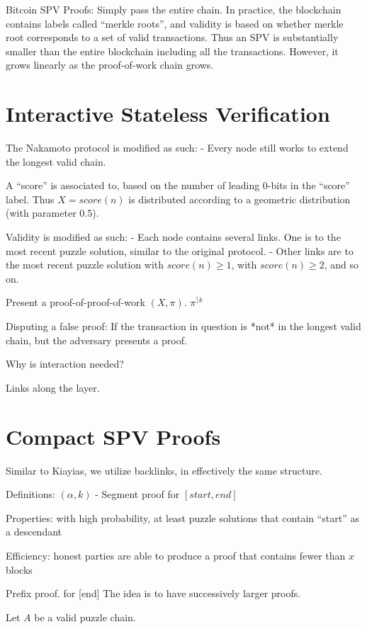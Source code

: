 \documentclass[11pt]{llncs}
\begin{document}
Bitcoin SPV Proofs:
	Simply pass the entire chain.
	In practice, the blockchain contains labels called “merkle roots”, and validity is based on whether merkle root corresponds to a set of valid transactions. Thus an SPV is substantially smaller than the entire blockchain including all the transactions. However, it grows linearly as the proof-of-work chain grows.

\section{Interactive Stateless Verification}

The Nakamoto protocol is modified as such:
- Every node still works to extend the longest valid chain.

A ``score'' is associated to, based on the number of leading 0-bits in the
``score'' label. Thus $X = score(n)$ is distributed according to a geometric distribution (with parameter 0.5).

Validity is modified as such:
- Each node contains several links. One is to the most recent puzzle solution, similar to the original protocol.
- Other links are to the most recent puzzle solution with $score(n) \geq
1$,  with $score(n) \geq 2$, and so on.

Present a proof-of-proof-of-work $(X, \pi)$. $\pi^{\rceil k}$

Disputing a false proof:
    If the transaction in question is *not* in the longest valid chain, but the adversary presents a proof.

Why is interaction needed?

Links along the layer.

\section{Compact SPV Proofs}

Similar to Kiayias, we utilize backlinks, in effectively the same structure.

Definitions:
$(\alpha, k)$ - Segment proof for $[start, end]$

Properties:
with high probability, at least puzzle solutions that contain ``start'' as a descendant

Efficiency:
	honest parties are able to produce a proof that contains fewer than $x$ blocks

Prefix proof.  for [end]
    The idea is to have successively larger proofs.

Let $A$ be a valid puzzle chain.
\end{document}
